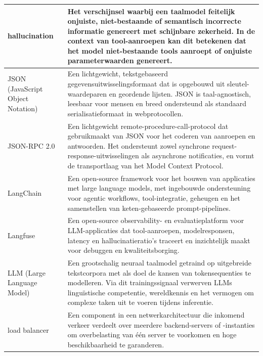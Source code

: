 \begin{longtable}{p{} p{}}
hallucination &
    Het verschijnsel waarbij een taalmodel feitelijk onjuiste, niet-bestaande of semantisch incorrecte informatie genereert met schijnbare zekerheid. In de context van tool-aanroepen kan dit betekenen dat het model niet-bestaande tools aanroept of onjuiste parameterwaarden genereert. \\
\midrule

JSON \newline \small(JavaScript Object Notation) &
    Een lichtgewicht, tekstgebaseerd gegevensuitwisselingsformaat dat is opgebouwd uit sleutel-waardeparen en geordende lijsten. JSON is taal-agnostisch, leesbaar voor mensen en breed ondersteund als standaard serialisatieformaat in webprotocollen. \\
\midrule

JSON-RPC 2.0 &
    Een lichtgewicht remote-procedure-call-protocol dat gebruikmaakt van JSON voor het coderen van aanroepen en antwoorden. Het ondersteunt zowel synchrone request-response-uitwisselingen als asynchrone notificaties, en vormt de transportlaag van het Model Context Protocol. \\
\midrule

LangChain &
    Een open-source framework voor het bouwen van applicaties met large language models, met ingebouwde ondersteuning voor agentic workflows, tool-integratie, geheugen en het samenstellen van keten-gebaseerde prompt-pipelines. \\
\midrule

Langfuse &
    Een open-source observability- en evaluatieplatform voor LLM-applicaties dat tool-aanroepen, modelresponsen, latency en hallucinatieratio's traceert en inzichtelijk maakt voor debuggen en kwaliteitsborging. \\
\midrule

LLM \newline \small(Large Language Model) &
    Een grootschalig neuraal taalmodel getraind op uitgebreide tekstcorpora met als doel de kansen van tokensequenties te modelleren. Via dit trainingssignaal verwerven LLMs linguïstische competentie, wereldkennis en het vermogen om complexe taken uit te voeren tijdens inferentie. \\
\midrule

load balancer &
    Een component in een netwerkarchitectuur die inkomend verkeer verdeelt over meerdere backend-servers of -instanties om overbelasting van één server te voorkomen en hoge beschikbaarheid te garanderen. \\
\midrule


\end{longtable}
